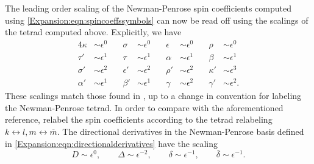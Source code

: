 	The leading order scaling of the Newman-Penrose spin coefficients computed using \eqref{Expansion:eqn:spincoeffssymbols} can now be read
	off using the scalings of the tetrad computed above. Explicitly, we have
	\begin{alignat}{4} 
	\kappa& \sim \epsilon^{0} \quad & \sigma& \sim \epsilon^{0} \quad & \epsilon& \sim \epsilon^{0} \quad & \rho&
	\sim \epsilon^{0} \nonumber \\
	\tau'& \sim \epsilon^{1} \quad & \tau& \sim \epsilon^{1} \quad & \alpha& \sim \epsilon^{1} \quad & \beta& \sim
	\epsilon^{1} \nonumber \\
	\sigma'& \sim \epsilon^{2} \quad & \epsilon'& \sim \epsilon^{2} \quad & \rho'& \sim \epsilon^{2} \quad &
	\kappa'& \sim \epsilon^{3} \nonumber \\
	\alpha'& \sim \epsilon^{1} \quad & \beta'& \sim \epsilon^{1} \quad & \gamma& \sim \epsilon^{2} \quad & \gamma'&
	\sim \epsilon^{2}. \label{Expansion:eqn:spincoeffsscaling}
	\end{alignat}
	These scalings match those found in \cite{Kunze:2004qd}, up to a change in convention for labeling the Newman-Penrose
	tetrad. In order to compare with the aforementioned reference, relabel the spin coefficients according to the
	tetrad relabeling $k \leftrightarrow l, m \leftrightarrow \overline{m}$. The directional derivatives in the
	Newman-Penrose basis defined in \eqref{Expansion:eqn:directionalderivatives} have the scaling
	\begin{equation}  
	D \sim \epsilon^{0}, \qquad \Delta \sim \epsilon^{-2}, \qquad \delta \sim \epsilon^{-1}, \qquad
	\overline{\delta} \sim \epsilon^{-1}.
	\end{equation}
	
